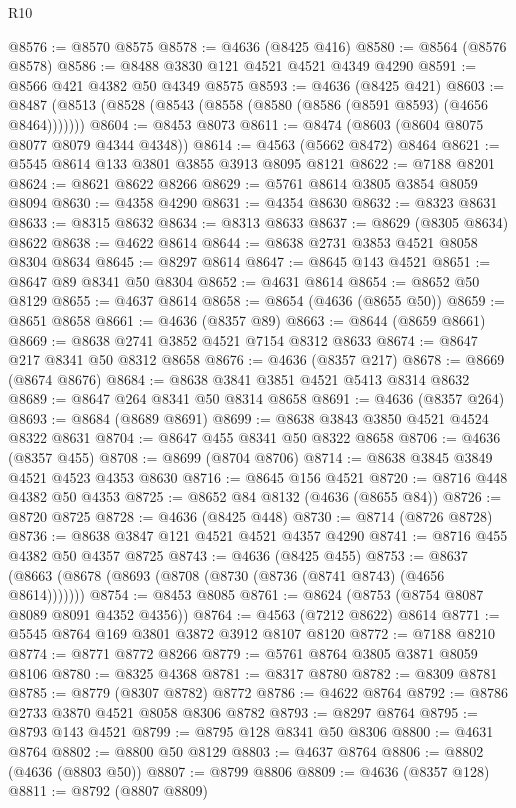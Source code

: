 \begin{lexlean}{R10}
\begin{coremodule}
@8576 := @8570 @8575
@8578 := @4636 (@8425 @416)
@8580 := @8564 (@8576 @8578)
@8586 := @8488 @3830 @121 @4521 @4521 @4349 @4290
@8591 := @8566 @421 @4382 @50 @4349 @8575
@8593 := @4636 (@8425 @421)
@8603 := @8487 (@8513 (@8528 (@8543 (@8558 (@8580 (@8586 (@8591 @8593) (@4656 @8464)))))))
@8604 := @8453 @8073
@8611 := @8474 (@8603 (@8604 @8075 @8077 @8079 @4344 @4348))
@8614 := @4563 (@5662 @8472) @8464
@8621 := @5545 @8614 @133 @3801 @3855 @3913 @8095 @8121
@8622 := @7188 @8201
@8624 := @8621 @8622 @8266
@8629 := @5761 @8614 @3805 @3854 @8059 @8094
@8630 := @4358 @4290
@8631 := @4354 @8630
@8632 := @8323 @8631
@8633 := @8315 @8632
@8634 := @8313 @8633
@8637 := @8629 (@8305 @8634) @8622
@8638 := @4622 @8614
@8644 := @8638 @2731 @3853 @4521 @8058 @8304 @8634
@8645 := @8297 @8614
@8647 := @8645 @143 @4521
@8651 := @8647 @89 @8341 @50 @8304
@8652 := @4631 @8614
@8654 := @8652 @50 @8129
@8655 := @4637 @8614
@8658 := @8654 (@4636 (@8655 @50))
@8659 := @8651 @8658
@8661 := @4636 (@8357 @89)
@8663 := @8644 (@8659 @8661)
@8669 := @8638 @2741 @3852 @4521 @7154 @8312 @8633
@8674 := @8647 @217 @8341 @50 @8312 @8658
@8676 := @4636 (@8357 @217)
@8678 := @8669 (@8674 @8676)
@8684 := @8638 @3841 @3851 @4521 @5413 @8314 @8632
@8689 := @8647 @264 @8341 @50 @8314 @8658
@8691 := @4636 (@8357 @264)
@8693 := @8684 (@8689 @8691)
@8699 := @8638 @3843 @3850 @4521 @4524 @8322 @8631
@8704 := @8647 @455 @8341 @50 @8322 @8658
@8706 := @4636 (@8357 @455)
@8708 := @8699 (@8704 @8706)
@8714 := @8638 @3845 @3849 @4521 @4523 @4353 @8630
@8716 := @8645 @156 @4521
@8720 := @8716 @448 @4382 @50 @4353
@8725 := @8652 @84 @8132 (@4636 (@8655 @84))
@8726 := @8720 @8725
@8728 := @4636 (@8425 @448)
@8730 := @8714 (@8726 @8728)
@8736 := @8638 @3847 @121 @4521 @4521 @4357 @4290
@8741 := @8716 @455 @4382 @50 @4357 @8725
@8743 := @4636 (@8425 @455)
@8753 := @8637 (@8663 (@8678 (@8693 (@8708 (@8730 (@8736 (@8741 @8743) (@4656 @8614)))))))
@8754 := @8453 @8085
@8761 := @8624 (@8753 (@8754 @8087 @8089 @8091 @4352 @4356))
@8764 := @4563 (@7212 @8622) @8614
@8771 := @5545 @8764 @169 @3801 @3872 @3912 @8107 @8120
@8772 := @7188 @8210
@8774 := @8771 @8772 @8266
@8779 := @5761 @8764 @3805 @3871 @8059 @8106
@8780 := @8325 @4368
@8781 := @8317 @8780
@8782 := @8309 @8781
@8785 := @8779 (@8307 @8782) @8772
@8786 := @4622 @8764
@8792 := @8786 @2733 @3870 @4521 @8058 @8306 @8782
@8793 := @8297 @8764
@8795 := @8793 @143 @4521
@8799 := @8795 @128 @8341 @50 @8306
@8800 := @4631 @8764
@8802 := @8800 @50 @8129
@8803 := @4637 @8764
@8806 := @8802 (@4636 (@8803 @50))
@8807 := @8799 @8806
@8809 := @4636 (@8357 @128)
@8811 := @8792 (@8807 @8809)

\end{coremodule}
\end{lexlean}
